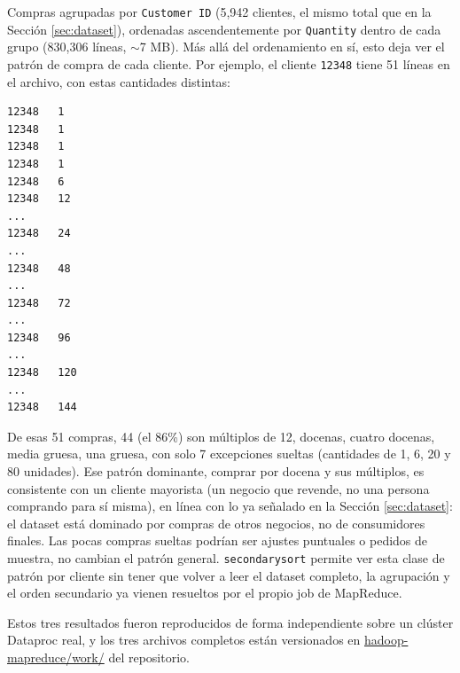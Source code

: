 Compras agrupadas por \texttt{Customer ID} (5{,}942 clientes, el mismo total que en la Sección \ref{sec:dataset}), ordenadas ascendentemente por \texttt{Quantity} dentro de cada grupo (830{,}306 líneas, $\sim$7 MB). Más allá del ordenamiento en sí, esto deja ver el patrón de compra de cada cliente. Por ejemplo, el cliente \texttt{12348} tiene 51 líneas en el archivo, con estas cantidades distintas:

\begin{verbatim}
12348   1
12348   1
12348   1
12348   1
12348   6
12348   12
...
12348   24
...
12348   48
...
12348   72
...
12348   96
...
12348   120
...
12348   144
\end{verbatim}

De esas 51 compras, 44 (el 86\%) son múltiplos de 12, docenas, cuatro docenas, media gruesa, una gruesa, con solo 7 excepciones sueltas (cantidades de 1, 6, 20 y 80 unidades). Ese patrón dominante, comprar por docena y sus múltiplos, es consistente con un cliente mayorista (un negocio que revende, no una persona comprando para sí misma), en línea con lo ya señalado en la Sección \ref{sec:dataset}: el dataset está dominado por compras de otros negocios, no de consumidores finales. Las pocas compras sueltas podrían ser ajustes puntuales o pedidos de muestra, no cambian el patrón general. \texttt{secondarysort} permite ver esta clase de patrón por cliente sin tener que volver a leer el dataset completo, la agrupación y el orden secundario ya vienen resueltos por el propio job de MapReduce.

Estos tres resultados fueron reproducidos de forma independiente sobre un clúster Dataproc real, y los tres archivos completos están versionados en \url{hadoop-mapreduce/work/} del repositorio.
